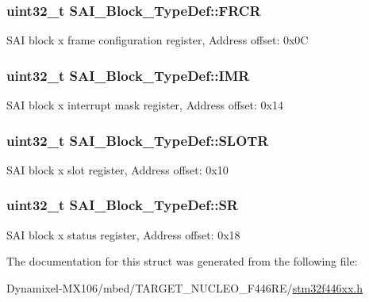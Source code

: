 \subsubsection[{\texorpdfstring{F\+R\+CR}{FRCR}}]{ uint32\+\_\+t S\+A\+I\+\_\+\+Block\+\_\+\+Type\+Def\+::\+F\+R\+CR}\hypertarget{struct_s_a_i___block___type_def_a56001d4b130f392c99dde9a06379af96}{}\label{struct_s_a_i___block___type_def_a56001d4b130f392c99dde9a06379af96}
S\+AI block x frame configuration register, Address offset\+: 0x0C 
\subsubsection[{\texorpdfstring{I\+MR}{IMR}}]{ uint32\+\_\+t S\+A\+I\+\_\+\+Block\+\_\+\+Type\+Def\+::\+I\+MR}\hypertarget{struct_s_a_i___block___type_def_aefcc864961c2bb0465e2ced3bd8b4a14}{}\label{struct_s_a_i___block___type_def_aefcc864961c2bb0465e2ced3bd8b4a14}
S\+AI block x interrupt mask register, Address offset\+: 0x14 
\subsubsection[{\texorpdfstring{S\+L\+O\+TR}{SLOTR}}]{ uint32\+\_\+t S\+A\+I\+\_\+\+Block\+\_\+\+Type\+Def\+::\+S\+L\+O\+TR}\hypertarget{struct_s_a_i___block___type_def_aaef957d89b76c3fa2c09ff61ee0db11d}{}\label{struct_s_a_i___block___type_def_aaef957d89b76c3fa2c09ff61ee0db11d}
S\+AI block x slot register, Address offset\+: 0x10 
\subsubsection[{\texorpdfstring{SR}{SR}}]{ uint32\+\_\+t S\+A\+I\+\_\+\+Block\+\_\+\+Type\+Def\+::\+SR}\hypertarget{struct_s_a_i___block___type_def_ad1505a32bdca9a2f8da708c7372cdafc}{}\label{struct_s_a_i___block___type_def_ad1505a32bdca9a2f8da708c7372cdafc}
S\+AI block x status register, Address offset\+: 0x18 

The documentation for this struct was generated from the following file\+:\begin{DoxyCompactItemize}
\item 
Dynamixel-\/\+M\+X106/mbed/\+T\+A\+R\+G\+E\+T\+\_\+\+N\+U\+C\+L\+E\+O\+\_\+\+F446\+R\+E/\hyperlink{stm32f446xx_8h}{stm32f446xx.\+h}\end{DoxyCompactItemize}
